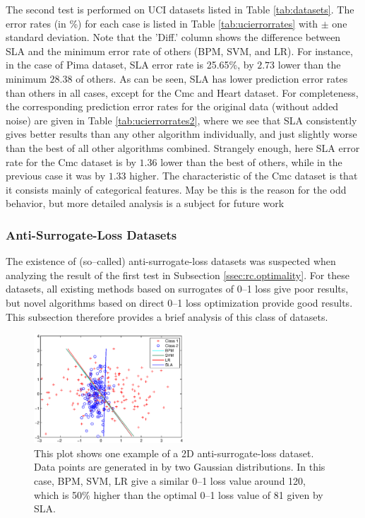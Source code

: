 The second test is performed on UCI datasets listed in Table
\ref{tab:datasets}. The error rates (in \%) for each case is listed in
Table \ref{tab:ucierrorrates} with $\pm$ one standard deviation. Note
that the 'Diff.' column shows the difference between SLA and the
minimum error rate of others (BPM, SVM, and LR). For instance, in the
case of Pima dataset, SLA error rate is 25.65\%, by $2.73$ lower than
the minimum $28.38$ of others. As can be seen, SLA has lower
prediction error rates than others in all cases, except for the Cmc
and Heart dataset. For completeness, the corresponding prediction
error rates for the original data (without added noise) are given in
Table \ref{tab:ucierrorrates2}, where we see that SLA consistently
gives better results than any other algorithm individually, and just
slightly worse than the best of all other algorithms
combined. Strangely enough, here SLA error rate for the Cmc dataset is
by $1.36$ lower than the best of others, while in the previous case it
was by $1.33$ higher. The characteristic of the Cmc dataset is that it
consists mainly of categorical features. May be this is the reason for
the odd behavior, but more detailed analysis is a subject for future
work


\subsubsection{Anti-Surrogate-Loss Datasets}
\label{ssec:rc.anti}

The existence of (so--called) anti-surrogate-loss datasets was
suspected when analyzing the result of the first test in Subsection
\ref{ssec:rc.optimality}. For these datasets, all existing methods
based on surrogates of 0--1 loss give poor results, but novel
algorithms based on direct 0--1 loss optimization provide good
results. This subsection therefore provides a brief analysis of this
class of datasets.

\begin{figure}[here]
\includegraphics[width=0.50\textwidth]{images/fig63_633a.eps}
\caption{ This plot shows one example of a 2D anti-surrogate-loss
  dataset. Data points are generated in by two Gaussian
  distributions. In this case, BPM, SVM, LR give a similar 0--1 loss
  value around 120, which is 50\% higher than the optimal 0--1 loss
  value of 81 given by SLA.  }
\label{fig:633a}
\end{figure}


